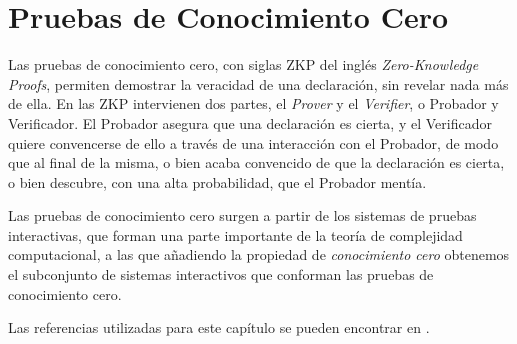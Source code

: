 
\chapter{Pruebas de Conocimiento Cero}\label{ch:zkp} 


%	


%

Las pruebas de conocimiento cero, con siglas ZKP del inglés \textit{Zero-Knowledge Proofs}, permiten demostrar la veracidad de una declaración, sin revelar nada más de ella. En las ZKP intervienen dos partes, el \textit{Prover} y el \textit{Verifier}, o Probador y Verificador. El Probador asegura que una declaración es cierta, y el Verificador quiere convencerse de ello a través de una interacción con el Probador, de modo que al final de la misma, o bien acaba convencido de que la declaración es cierta, o bien descubre, con una alta probabilidad, que el Probador mentía.

Las pruebas de conocimiento cero surgen a partir de los sistemas de pruebas interactivas, que forman una parte importante de la teoría de complejidad computacional, a las que añadiendo la propiedad de \textit{conocimiento cero} obtenemos el subconjunto de sistemas interactivos que conforman las pruebas de conocimiento cero.

Las referencias utilizadas para este capítulo se pueden encontrar en \citep{pieprzyk2013fundamentals, rosen2007discrete, blum, damgardcommitment, pardo2012introduction, menezes1996handbook, stinson2005cryptography}.



